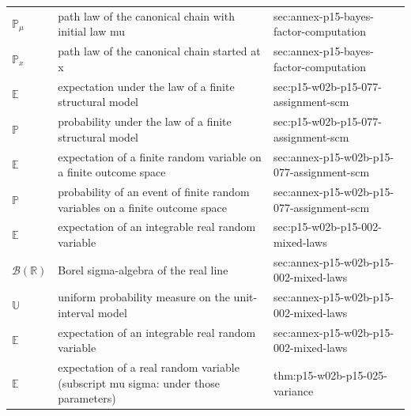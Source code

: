 \begin{longtable}{@{}p{}p{}p{}@{}}
\(\mathbb P_\mu\) & path law of the canonical chain with initial law mu & sec:\allowbreak{}annex-\allowbreak{}p15-\allowbreak{}bayes-\allowbreak{}factor-\allowbreak{}computation \\
\(\mathbb P_x\) & path law of the canonical chain started at x & sec:\allowbreak{}annex-\allowbreak{}p15-\allowbreak{}bayes-\allowbreak{}factor-\allowbreak{}computation \\
\(\mathbb E\) & expectation under the law of a finite structural model & sec:\allowbreak{}p15-\allowbreak{}w02b-\allowbreak{}p15-\allowbreak{}077-\allowbreak{}assignment-\allowbreak{}scm \\
\(\mathbb P\) & probability under the law of a finite structural model & sec:\allowbreak{}p15-\allowbreak{}w02b-\allowbreak{}p15-\allowbreak{}077-\allowbreak{}assignment-\allowbreak{}scm \\
\(\mathbb E\) & expectation of a finite random variable on a finite outcome space & sec:\allowbreak{}annex-\allowbreak{}p15-\allowbreak{}w02b-\allowbreak{}p15-\allowbreak{}077-\allowbreak{}assignment-\allowbreak{}scm \\
\(\mathbb P\) & probability of an event of finite random variables on a finite outcome space & sec:\allowbreak{}annex-\allowbreak{}p15-\allowbreak{}w02b-\allowbreak{}p15-\allowbreak{}077-\allowbreak{}assignment-\allowbreak{}scm \\
\(\mathbb E\) & expectation of an integrable real random variable & sec:\allowbreak{}p15-\allowbreak{}w02b-\allowbreak{}p15-\allowbreak{}002-\allowbreak{}mixed-\allowbreak{}laws \\
\(\mathcal B(\mathbb R)\) & Borel sigma-algebra of the real line & sec:\allowbreak{}annex-\allowbreak{}p15-\allowbreak{}w02b-\allowbreak{}p15-\allowbreak{}002-\allowbreak{}mixed-\allowbreak{}laws \\
\(\mathbb U\) & uniform probability measure on the unit-interval model & sec:\allowbreak{}annex-\allowbreak{}p15-\allowbreak{}w02b-\allowbreak{}p15-\allowbreak{}002-\allowbreak{}mixed-\allowbreak{}laws \\
\(\mathbb E\) & expectation of an integrable real random variable & sec:\allowbreak{}annex-\allowbreak{}p15-\allowbreak{}w02b-\allowbreak{}p15-\allowbreak{}002-\allowbreak{}mixed-\allowbreak{}laws \\
\(\mathbb E\) & expectation of a real random variable (subscript mu sigma: under those parameters) & thm:\allowbreak{}p15-\allowbreak{}w02b-\allowbreak{}p15-\allowbreak{}025-\allowbreak{}variance \\

\end{longtable}
